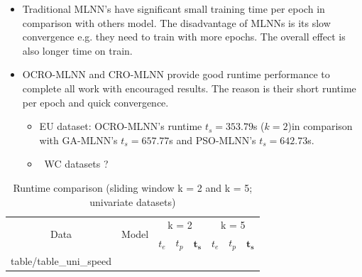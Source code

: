 \documentclass[review,3p,authoryear]{elsarticle}
\makeatletter
\def \GN#1{\textcolor{tn_orange}{~#1}}			%
\newcommand\primitiveinput[1]
		{\@@input #1 }
\makeatother
\begin{document}
{\begin{itemize}
\item Traditional MLNN's have significant small training time per epoch in comparison with others model. The disadvantage of MLNNs is its slow convergence e.g. they need to train with more epochs. The overall effect is also longer time on train. 


\item OCRO-MLNN and CRO-MLNN provide good runtime performance to complete all work with encouraged results. The reason is their short runtime per epoch and quick convergence.
	\begin{itemize}
		\item EU dataset: 	OCRO-MLNN's runtime $t_s = 353.79$s ($k = 2$)in comparison with 
						GA-MLNN's $t_{s} = 657.77$s and 
						PSO-MLNN's $t_{s} = 642.73$s.
		\item \GN{WC datasets ?}
	\end{itemize}

\end{itemize}


\begin{table}[!h]
	\caption{Runtime comparison (sliding window k = 2 and k = 5; univariate datasets)}
	\label{table:uni_speed}
	\centering
	\begin{adjustbox}{width=0.7\textwidth}
		\begin{tabular}{| c | c | c | c | c | c | c | c |}%
			\hline
			\multirow{2}{*}{Data} & \multirow{2}{*}{Model} & \multicolumn{3}{c|}{k = 2} & \multicolumn{3}{c|}{ k = 5 } \\ \cline{3-8}
   				& & $t_e$ & $t_p$ & $\boldsymbol{t_s}$ & $t_e$ & $t_p$ & $\boldsymbol{t_s}$  \\ [0.5ex] \hline
			\primitiveinput{table/table_uni_speed}
			\hline
		\end{tabular}
	\end{adjustbox}
\end{table}



}
\end{document}
